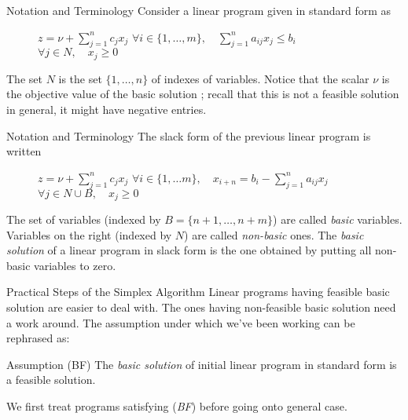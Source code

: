 \documentclass[aspectratio = 169]{beamer}
\begin{document}
\begin{frame}{Notation and Terminology}
    Consider a linear program given in standard form as
    \begin{figure}
        \begin{linearProgG}{
            ${\displaystyle z = \nu + \sum_{j=1}^n c_jx_j}$
            }{
            ${\displaystyle \forall i \in \{ 1, \ldots, m \}, \quad \sum_{j=1}^n a_{ij}x_j \leq b_i}$
            }{
            $\forall j \in N, \quad x_j \geq 0$
            }
        \end{linearProgG}
    \end{figure}
    The set $N$ is the set $\{ 1, \ldots, n \}$ of indexes of
    variables. Notice that the scalar $\nu$ is the objective value of
    the basic solution ; recall that this is not a feasible solution
    in general, it might have negative entries.
\end{frame}

\begin{frame}{Notation and Terminology}
    The slack form of the previous linear program is written
    \begin{figure}
        \begin{linearProgG}{
            ${\displaystyle z = \nu + \sum_{j=1}^n c_jx_j}$
            }{
            ${\displaystyle \forall i \in \{1, \ldots m \}, \quad x_{i + n} = b_i - \sum_{j=1}^n a_{ij}x_j}$
            }{
            $\forall j \in N\cup B, \quad x_j \geq 0$
            }
        \end{linearProgG}
    \end{figure}
    The set of variables (indexed by $B = \{n + 1, \ldots, n + m \}$)
    are called \emph{basic} variables. Variables on the right (indexed
    by $N$) are called \emph{non-basic} ones. The \emph{basic
      solution} of a linear program in slack form is the one obtained
    by putting all non-basic variables to zero.
\end{frame}

\begin{frame}{Practical Steps of the Simplex Algorithm}
  Linear programs having feasible basic solution are easier to deal
  with. The ones having non-feasible basic solution need a work
  around. The assumption under which we've been working can be
  rephrased as:
  \begin{alertblock}{Assumption (BF)}
    The \textit{basic solution} of initial linear program in
    standard form is a feasible solution.
  \end{alertblock}
  We first treat programs satisfying (\emph{BF}) before going onto
  general case.
\end{frame}
\end{document}
